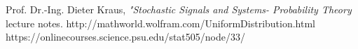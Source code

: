 \begin{thebibliography}{15}
 Prof. Dr.-Ing. Dieter Kraus,\textit{ "Stochastic Signals and Systems- Probability Theory} lecture notes.
 http://mathworld.wolfram.com/UniformDistribution.html
 https://onlinecourses.science.psu.edu/stat505/node/33/



\end{thebibliography}